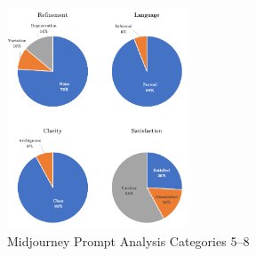 \begin{figure}[t]
    \centering
    \includegraphics[width=0.475\textwidth]{images/charts4}
    \caption{Midjourney Prompt Analysis Categories 5--8}
    \label{fig:midjourney-categories-2}
\end{figure}

